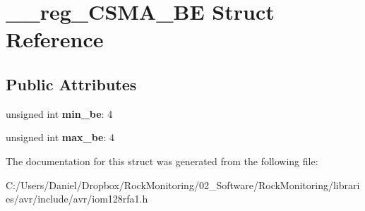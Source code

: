 \hypertarget{struct____reg___c_s_m_a___b_e}{}\section{\+\_\+\+\_\+reg\+\_\+\+C\+S\+M\+A\+\_\+\+BE Struct Reference}
\label{struct____reg___c_s_m_a___b_e}
\subsection*{Public Attributes}
\begin{DoxyCompactItemize}
\item 
unsigned int {\bfseries min\+\_\+be}\+: 4\hypertarget{struct____reg___c_s_m_a___b_e_a0072ca3ca3e868ffec2d6cd22bfda8e9}{}\label{struct____reg___c_s_m_a___b_e_a0072ca3ca3e868ffec2d6cd22bfda8e9}

\item 
unsigned int {\bfseries max\+\_\+be}\+: 4\hypertarget{struct____reg___c_s_m_a___b_e_a13d0469d42ebcbcd0f08fe9c58d1e758}{}\label{struct____reg___c_s_m_a___b_e_a13d0469d42ebcbcd0f08fe9c58d1e758}

\end{DoxyCompactItemize}


The documentation for this struct was generated from the following file\+:\begin{DoxyCompactItemize}
\item 
C\+:/\+Users/\+Daniel/\+Dropbox/\+Rock\+Monitoring/02\+\_\+\+Software/\+Rock\+Monitoring/libraries/avr/include/avr/iom128rfa1.\+h\end{DoxyCompactItemize}
